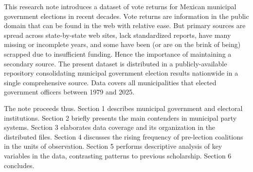 \documentclass[letter,12pt]{article}
\begin{document}

This research note introduces a dataset of vote returns for Mexican municipal government elections in recent decades. Vote returns are information in the public domain that can be found in the web with relative ease. But primary sources are spread across state-by-state web sites, lack standardized reports, have many missing or incomplete years, and some have been (or are on the brink of being) scrapped due to insufficient funding. Hence the importance of maintaining a secondary source. The present dataset is distributed in a publicly-available repository consolidating municipal government election results nationwide in a single comprehensive source. Data covers all municipalities that elected government officers between 1979 and 2025.


The note proceeds thus. Section 1 describes municipal government and electoral institutions. Section 2 briefly presents the main contenders in municipal party systems. Section 3 elaborates data coverage and its organization in the distributed files. Section 4 discusses the rising frequency of pre-lection coalitions in the units of observation. Section 5 performs descriptive analysis of key variables in the data, contrasting patterns to previous scholarship. Section 6 concludes.
\end{document}

